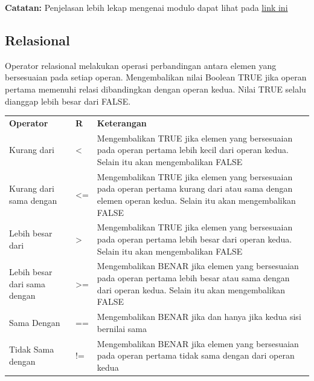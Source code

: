 \documentclass[
]{book}
\begin{document}
\textbf{Catatan:} Penjelasan lebih lekap mengenai modulo dapat lihat pada \href{https://www.omnicalculator.com/math/modulo}{link ini}

\hypertarget{relasional}{%
\subsection{Relasional}\label{relasional}}

Operator relasional melakukan operasi perbandingan antara elemen yang bersesuaian pada setiap operan. Mengembalikan nilai Boolean TRUE jika operan pertama memenuhi relasi dibandingkan dengan operan kedua. Nilai TRUE selalu dianggap lebih besar dari FALSE.

\begin{longtable}[]{@{}
  >{\centering\arraybackslash}p{}
  >{\centering\arraybackslash}p{}
  >{\centering\arraybackslash}p{}@{}}
\toprule\noalign{}
\endhead
\bottomrule\noalign{}
\endlastfoot
\textbf{Operator} & \textbf{R} & \textbf{Keterangan} \\
Kurang dari & \textless{} & Mengembalikan TRUE jika elemen yang bersesuaian pada operan pertama lebih kecil dari operan kedua. Selain itu akan mengembalikan FALSE \\
Kurang dari sama dengan & \textless= & Mengembalikan TRUE jika elemen yang bersesuaian pada operan pertama kurang dari atau sama dengan elemen operan kedua. Selain itu akan mengembalikan FALSE \\
Lebih besar dari & \textgreater{} & Mengembalikan TRUE jika elemen yang bersesuaian pada operan pertama lebih besar dari operan kedua. Selain itu akan mengembalikan FALSE \\
Lebih besar dari sama dengan & \textgreater= & Mengembalikan BENAR jika elemen yang bersesuaian pada operan pertama lebih besar atau sama dengan dari operan kedua. Selain itu akan mengembalikan FALSE \\
Sama Dengan & == & Mengembalikan BENAR jika dan hanya jika kedua sisi bernilai sama \\
Tidak Sama dengan & != & Mengembalikan BENAR jika elemen yang bersesuaian pada operan pertama tidak sama dengan dari operan kedua \\
\end{longtable}
\end{document}
